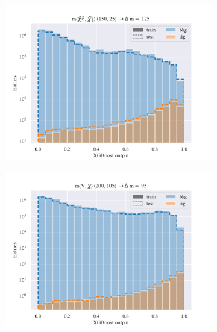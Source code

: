 \begin{figure}[H]
\begin{subfigure}[t!]{0.49\textwidth}
        \includegraphics[width = \textwidth]{Figures/WW/BDT/Low_level/Low/scaled_train_test_395268.pdf}
        \caption{}
        \label{fig:traintestscaledBDTWWLow}
    \end{subfigure}
    \begin{subfigure}[t!]{0.49\textwidth}
        \includegraphics[width = \textwidth]{Figures/Mono_Z/ML/BDT/Low_level/Low/scaled_train_test_310604.pdf}
        \caption{}
        \label{fig:traintestscaledBDTMonoZLow}
    \end{subfigure}
    \caption{}
    \label{fig:Non}
\end{figure}

